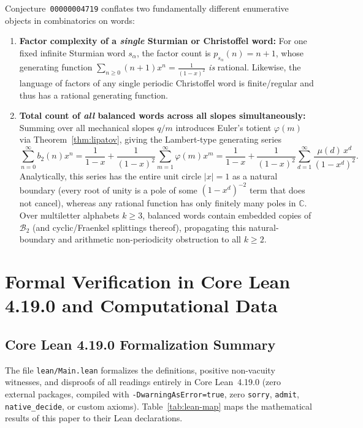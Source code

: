 \documentclass[11pt,a4paper]{article}
\theoremstyle{definition}
\begin{document}
Conjecture~\texttt{00000004719} conflates two fundamentally different enumerative objects in combinatorics on words:
\begin{enumerate}
  \item \textbf{Factor complexity of a \emph{single} Sturmian or Christoffel word:} For one fixed infinite Sturmian word $s_\alpha$, the factor count is $p_{s_\alpha}(n) = n + 1$, whose generating function $\sum_{n \ge 0} (n + 1)x^n = \frac{1}{(1-x)^2}$ \emph{is} rational. Likewise, the language of factors of any single periodic Christoffel word is finite/regular and thus has a rational generating function.
  \item \textbf{Total count of \emph{all} balanced words across all slopes simultaneously:} Summing over all mechanical slopes $q/m$ introduces Euler's totient $\varphi(m)$ via Theorem~\ref{thm:lipatov}, giving the Lambert-type generating series
  \[
    \sum_{n=0}^{\infty} b_2(n) x^n = \frac{1}{1 - x} + \frac{1}{(1 - x)^2}\sum_{m=1}^{\infty} \varphi(m) x^m = \frac{1}{1 - x} + \frac{1}{(1 - x)^2}\sum_{d=1}^{\infty} \frac{\mu(d)\, x^d}{(1 - x^d)^2}.
  \]
  Analytically, this series has the entire unit circle $|x| = 1$ as a natural boundary (every root of unity is a pole of some $(1 - x^d)^{-2}$ term that does not cancel), whereas any rational function has only finitely many poles in $\mathbb{C}$. Over multiletter alphabets $k \ge 3$, balanced words contain embedded copies of $\mathcal{B}_2$ (and cyclic/Fraenkel splittings thereof), propagating this natural-boundary and arithmetic non-periodicity obstruction to all $k \ge 2$.
\end{enumerate}

\section{Formal Verification in Core Lean 4.19.0 and Computational Data}

\subsection{Core Lean 4.19.0 Formalization Summary}
The file \texttt{lean/Main.lean} formalizes the definitions, positive non-vacuity witnesses, and disproofs of all readings entirely in Core Lean~4.19.0 (zero external packages, compiled with \texttt{-DwarningAsError=true}, zero \texttt{sorry}, \texttt{admit}, \texttt{native\_decide}, or custom axioms). Table~\ref{tab:lean-map} maps the mathematical results of this paper to their Lean declarations.
\end{document}
